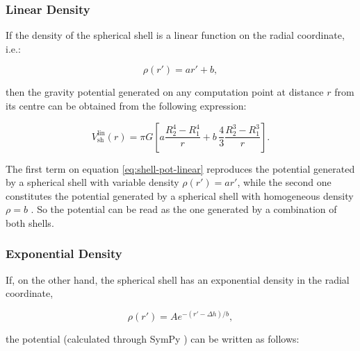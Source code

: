 \documentclass[extra]{gji}
\begin{document}
\subsubsection{Linear Density}

If the density of the spherical shell is a linear function on the radial coordinate, i.e.:

\begin{equation}
    \rho(r') = ar' + b,
\end{equation}

\noindent then the gravity potential generated on any computation point at distance $r$ from its centre can be obtained from the following expression:

\begin{equation}
    V_\text{sh}^\text{lin}(r) = \pi G \left[ 
    a \frac{R_2^4 - R_1^4}{r} +
    b \,\frac{4}{3} \frac{R_2^3 - R_1^3}{r} \right].
    \label{eq:shell-pot-linear}
\end{equation}

The first term on equation \ref{eq:shell-pot-linear} reproduces the potential generated by a spherical shell with variable density $\rho(r') = ar'$, while the second one constitutes the potential generated by a spherical shell with homogeneous density $\rho = b$ \citep{Mikuska2006,Grombein2013}.
So the potential can be read as the one generated by a combination of both shells.


\subsubsection{Exponential Density}

If, on the other hand, the spherical shell has an exponential density in the radial coordinate,

\begin{equation}
    \rho(r') = Ae^{-(r' - \Delta h)/b},
\end{equation}

\noindent the potential (calculated through SymPy \citep{sympy2017}) can be written as follows:

\end{document}
